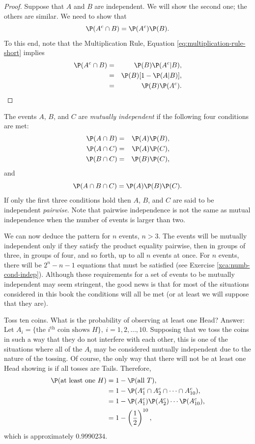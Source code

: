 \documentclass[captions=tableheading]{scrbook}
\begin{document}
\begin{proof}
Suppose that \(A\) and \(B\) are independent. We will show the second one; the others are similar. We need to show that
\[
\P(A^{c}\cap B)=\P(A^{c})\P(B).
\]
To this end, note that the Multiplication Rule, Equation \ref{eq:multiplication-rule-short} implies 
\begin{eqnarray*}
\P(A^{c}\cap B) & = & \P(B)\P(A^{c}|B),\\
 & = & \P(B)[1-\P(A|B)],\\
 & = & \P(B)\P(A^{c}).
\end{eqnarray*}
\end{proof}

\begin{defn}
The events \(A\), \(B\), and \(C\) are \emph{mutually independent} if the following four conditions are met: 
\begin{eqnarray*}
\P(A\cap B) & = & \P(A)\P(B),\\
\P(A\cap C) & = & \P(A)\P(C),\\
\P(B\cap C) & = & \P(B)\P(C),
\end{eqnarray*}
and
\[
\P(A\cap B\cap C)=\P(A)\P(B)\P(C).
\]
If only the first three conditions hold then \(A\), \(B\), and \(C\) are said to be independent \emph{pairwise}. Note that pairwise independence is not the same as mutual independence when the number of events is larger than two.
\end{defn}

We can now deduce the pattern for \(n\) events, \(n>3\). The events will be mutually independent only if they satisfy the product equality pairwise, then in groups of three, in groups of four, and so forth, up to all \(n\) events at once. For \(n\) events, there will be \(2^{n}-n-1\) equations that must be satisfied (see Exercise \ref{xca:numb-cond-indep}). Although these requirements for a set of events to be mutually independent may seem stringent, the good news is that for most of the situations considered in this book the conditions will all be met (or at least we will suppose that they are).

\begin{example}
\label{exa:toss-ten-coins}
Toss ten coins. What is the probability of observing at least one Head? Answer: Let \(A_{i}= \{ \mbox{the }i^{\mathrm{th}}\mbox{ coin shows }H \} ,\ i=1,2,\ldots,10\). Supposing that we toss the coins in such a way that they do not interfere with each other, this is one of the situations where all of the \(A_{i}\) may be considered mutually independent due to the nature of the tossing. Of course, the only way that there will not be at least one Head showing is if all tosses are Tails. Therefore,
\begin{align*}
\P(\mbox{at least one }H) & =1-\P(\mbox{all }T),\\
 & =1-\P(A_{1}^{c}\cap A_{2}^{c}\cap\cdots\cap A_{10}^{c}),\\
 & =1-\P(A_{1}^{c})\P(A_{2}^{c})\cdots\P(A_{10}^{c}),\\
 & =1-\left(\frac{1}{2}\right)^{10},
\end{align*}
which is approximately \(0.9990234\).

\end{example}
\end{document}
